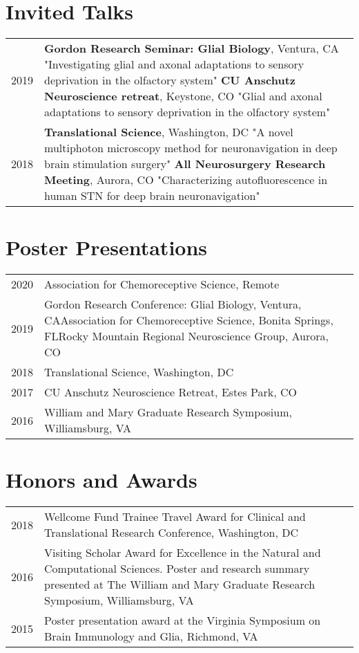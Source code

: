 \documentclass[11pt]{article}
\begin{document}
\section*{Invited Talks}
\label{sec:org4d62668}
\begin{tabular}{lp{}}

2019& \textbf{Gordon Research Seminar: Glial Biology}, Ventura, CA \newline "Investigating glial and axonal adaptations to sensory deprivation in the olfactory system"\newline
\textbf{CU Anschutz Neuroscience retreat}, Keystone, CO \newline "Glial and axonal adaptations to sensory deprivation in the olfactory system" \\
2018& \textbf{Translational Science}, Washington, DC \newline "A novel multiphoton microscopy method for neuronavigation in deep brain stimulation surgery"
 \newline \textbf{All Neurosurgery Research Meeting}, Aurora, CO \newline "Characterizing autofluorescence in human STN for deep brain neuronavigation"\\
\end{tabular}
\section*{Poster Presentations}
\label{sec:org226a762}
\begin{tabular}{lp{}}
2020& Association for Chemoreceptive Science, Remote\\
2019& Gordon Research Conference: Glial Biology, Ventura, CA\newline Association for Chemoreceptive Science, Bonita Springs, FL\newline Rocky Mountain Regional Neuroscience Group, Aurora, CO\\
2018& Translational Science, Washington, DC\\
2017& CU Anschutz Neuroscience Retreat, Estes Park, CO\\
2016& William and Mary Graduate Research Symposium, Williamsburg, VA
\end{tabular}
\section*{Honors and Awards}
\label{sec:org69bf9b0}
\begin{tabular}{lp{}}
2018& Wellcome Fund Trainee Travel Award for Clinical and Translational Research Conference, Washington, DC\\
2016& Visiting Scholar Award for Excellence in the Natural and Computational Sciences. Poster and research summary presented at The William and Mary Graduate Research Symposium, Williamsburg, VA \\
2015& Poster presentation award at the Virginia Symposium on Brain Immunology and Glia, Richmond, VA
\end{tabular}
\end{document}
